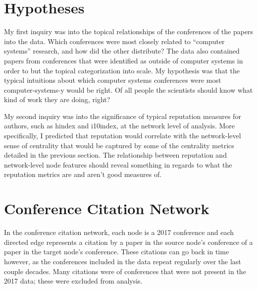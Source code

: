 \documentclass{article}
\begin{document}
\section{Hypotheses}

My first inquiry was into the topical relationships of the conferences of the papers into the data.
Which conferences were most closely related to ``computer systems'' research, and how did the other distribute?
The data also contained papers from conferences that were identified as outside of computer systems in order to but the topical categorization into scale.
My hypothesis was that the typical intuitions about which computer systems conferences were most computer-systems-y would be right.
Of all people the scientists should know what kind of work they are doing, right?

My second inquiry was into the significance of typical reputation measures for authors, such as hindex and i10index, at the network level of analysis. More specifically, I predicted that reputation would correlate with the network-level sense of centrality that would be captured by some of the centrality metrics detailed in the previous section. The relationship between reputation and network-level node features should reveal something in regards to what the reputation metrics are and aren't good measures of.

\section{Conference Citation Network}

In the conference citation network, each node is a 2017 conference and each directed edge represents a citation by a paper in the source node's conference of a paper in the target node's conference. These citations can go back in time however, as the conferences included in the data repeat regularly over the last couple decades. Many citations were of conferences that were not present in the 2017 data; these were excluded from analysis.
\end{document}
